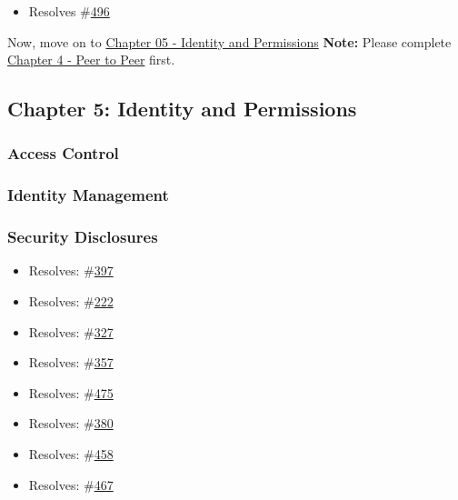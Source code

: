 \begin{itemize}
\tightlist
\item
  Resolves \#\href{https://github.com/orbitdb/orbit-db/issues/496}{496}
\end{itemize}

Now, move on to \href{./05_Identity_Permission.md}{Chapter 05 - Identity
and Permissions} \textbf{Note:} Please complete
\href{./04_P2P.md}{Chapter 4 - Peer to Peer} first.

\subsection{Chapter 5: Identity and
Permissions}\label{chapter-5-identity-and-permissions}

\subsubsection{Access Control}\label{access-control}

\subsubsection{Identity Management}\label{identity-management}

\subsubsection{Security Disclosures}\label{security-disclosures}

\begin{itemize}
\tightlist
\item
  Resolves: \#\href{https://github.com/orbitdb/orbit-db/issues/397}{397}
\item
  Resolves: \#\href{https://github.com/orbitdb/orbit-db/issues/222}{222}
\item
  Resolves: \#\href{https://github.com/orbitdb/orbit-db/issues/327}{327}
\item
  Resolves: \#\href{https://github.com/orbitdb/orbit-db/issues/357}{357}
\item
  Resolves: \#\href{https://github.com/orbitdb/orbit-db/issues/475}{475}
\item
  Resolves: \#\href{https://github.com/orbitdb/orbit-db/issues/380}{380}
\item
  Resolves: \#\href{https://github.com/orbitdb/orbit-db/issues/458}{458}
\item
  Resolves: \#\href{https://github.com/orbitdb/orbit-db/issues/467}{467}
\end{itemize}

